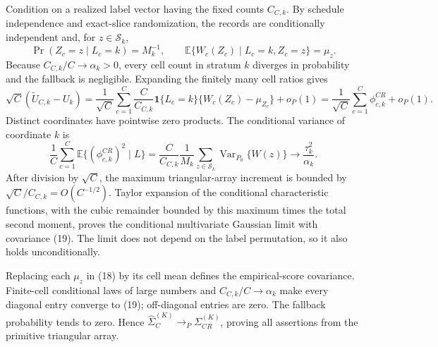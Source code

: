 Condition on a realized label vector having the fixed counts \(C_{C,k}\).  By schedule independence and exact-slice randomization, the records are conditionally independent and, for \(z\in\mathcal S_k\),
\[
 \Pr(Z_c=z\mid L_c=k)=M_k^{-1},\qquad
 \mathbb E\{W_c(Z_c)\mid L_c=k,Z_c=z\}=\mu_z. \tag{17}
\]
Because \(C_{C,k}/C\to\alpha_k>0\), every cell count in stratum \(k\) diverges in probability and the fallback is negligible.  Expanding the finitely many cell ratios gives
\[
 \sqrt C(\widetilde U_{C,k}-U_k)
 =\frac1{\sqrt C}\sum_{c=1}^C\frac{C}{C_{C,k}}\mathbf1\{L_c=k\}
 \{W_c(Z_c)-\mu_{Z_c}\}+o_P(1)
 =\frac1{\sqrt C}\sum_{c=1}^C\phi_{c,k}^{CR}+o_P(1). \tag{18}
\]
Distinct coordinates have pointwise zero products.  The conditional variance of coordinate \(k\) is
\[
 \frac1C\sum_{c=1}^C\mathbb E\{(\phi_{c,k}^{CR})^2\mid L\}
 =\frac{C}{C_{C,k}}\frac1{M_k}\sum_{z\in\mathcal S_k}
 \operatorname{Var}_{P_0}\{W(z)\}
 \longrightarrow\frac{\tau_k^2}{\alpha_k}. \tag{19}
\]
After division by \(\sqrt C\), the maximum triangular-array increment is bounded by \(\sqrt C/C_{C,k}=O(C^{-1/2})\).  Taylor expansion of the conditional characteristic functions, with the cubic remainder bounded by this maximum times the total second moment, proves the conditional multivariate Gaussian limit with covariance (19).  The limit does not depend on the label permutation, so it also holds unconditionally.

Replacing each \(\mu_z\) in (18) by its cell mean defines the empirical-score covariance.  Finite-cell conditional laws of large numbers and \(C_{C,k}/C\to\alpha_k\) make every diagonal entry converge to (19); off-diagonal entries are zero.  The fallback probability tends to zero.  Hence \(\widehat\Sigma_C^{(K)}\to_P\Sigma_{CR}^{(K)}\), proving all assertions from the primitive triangular array.
